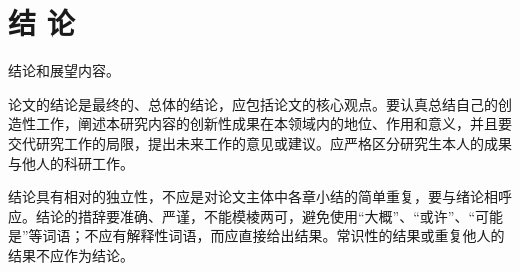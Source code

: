 
\chapter{结 论}
	结论和展望内容。
	
	论文的结论是最终的、总体的结论，应包括论文的核心观点。要认真总结自己的创造性工作，阐述本研究内容的创新性成果在本领域内的地位、作用和意义，并且要交代研究工作的局限，提出未来工作的意见或建议。应严格区分研究生本人的成果与他人的科研工作。

    结论具有相对的独立性，不应是对论文主体中各章小结的简单重复，要与绪论相呼应。结论的措辞要准确、严谨，不能模棱两可，避免使用“大概”、“或许”、“可能是”等词语；不应有解释性词语，而应直接给出结果。常识性的结果或重复他人的结果不应作为结论。